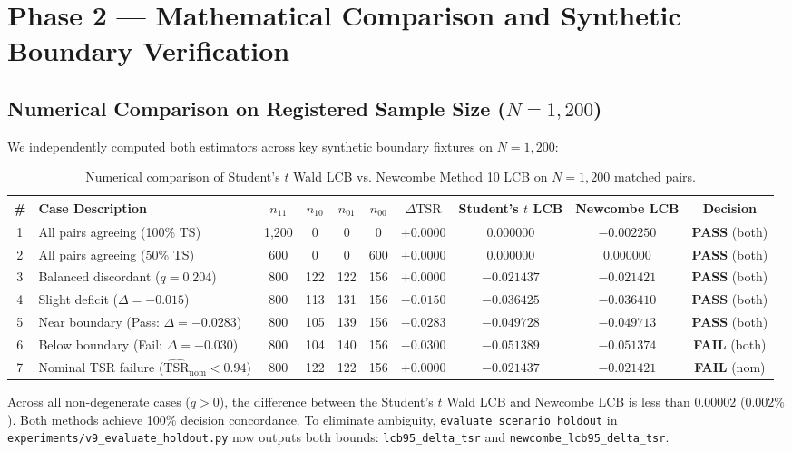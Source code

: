 \documentclass[10pt,a4paper]{article}
\begin{document}
\section{Phase 2 — Mathematical Comparison and Synthetic Boundary Verification}

\subsection{Numerical Comparison on Registered Sample Size ($N = 1,200$)}
We independently computed both estimators across key synthetic boundary fixtures on $N = 1,200$:

\begin{table}[h!]
\centering
\small
\begin{tabularx}{\textwidth}{c l c c c c c c c c}
\toprule
\textbf{\#} & \textbf{Case Description} & $n_{11}$ & $n_{10}$ & $n_{01}$ & $n_{00}$ & $\Delta\mathrm{TSR}$ & \textbf{Student's $t$ LCB} & \textbf{Newcombe LCB} & \textbf{Decision} \\
\midrule
1 & All pairs agreeing (100\% TS) & 1,200 & 0 & 0 & 0 & $+0.0000$ & $0.000000$ & $-0.002250$ & \textbf{PASS} (both) \\
2 & All pairs agreeing (50\% TS) & 600 & 0 & 0 & 600 & $+0.0000$ & $0.000000$ & $0.000000$ & \textbf{PASS} (both) \\
3 & Balanced discordant ($q = 0.204$) & 800 & 122 & 122 & 156 & $+0.0000$ & $-0.021437$ & $-0.021421$ & \textbf{PASS} (both) \\
4 & Slight deficit ($\Delta = -0.015$) & 800 & 113 & 131 & 156 & $-0.0150$ & $-0.036425$ & $-0.036410$ & \textbf{PASS} (both) \\
5 & Near boundary (Pass: $\Delta = -0.0283$) & 800 & 105 & 139 & 156 & $-0.0283$ & $-0.049728$ & $-0.049713$ & \textbf{PASS} (both) \\
6 & Below boundary (Fail: $\Delta = -0.030$) & 800 & 104 & 140 & 156 & $-0.0300$ & $-0.051389$ & $-0.051374$ & \textbf{FAIL} (both) \\
7 & Nominal TSR failure ($\widehat{\mathrm{TSR}}_{\mathrm{nom}} < 0.94$) & 800 & 122 & 122 & 156 & $+0.0000$ & $-0.021437$ & $-0.021421$ & \textbf{FAIL} (nom) \\
\bottomrule
\end{tabularx}
\caption{Numerical comparison of Student's $t$ Wald LCB vs. Newcombe Method 10 LCB on $N = 1,200$ matched pairs.}
\end{table}

Across all non-degenerate cases ($q > 0$), the difference between the Student's $t$ Wald LCB and Newcombe LCB is less than $0.00002$ ($0.002\%$). Both methods achieve 100\% decision concordance. To eliminate ambiguity, \texttt{evaluate\_scenario\_holdout} in \texttt{experiments/v9\_evaluate\_holdout.py} now outputs both bounds: \texttt{lcb95\_delta\_tsr} and \texttt{newcombe\_lcb95\_delta\_tsr}.
\end{document}
